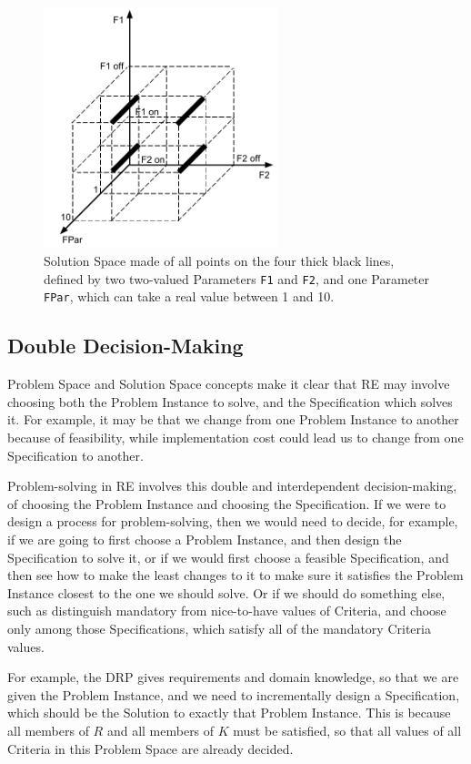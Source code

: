 \documentclass[graybox]{svmult}
\newcommand{\xt}[1]{\texttt{#1}}
\newcommand{\req}[1]{\xt{#1}}
\newcommand{\RE}{RE}
\newcommand{\ZJRP}{DRP}
\newcommand{\SolutionSpace}{Solution Space}
\newcommand{\ProblemSpace}{Problem Space}
\newcommand{\Specification}{Specification}
\newcommand{\Solution}{Solution}
\newcommand{\Criteria}{Criteria}
\newcommand{\ProblemInstance}{Problem Instance}
\newcommand{\Parameter}{Parameter}
\begin{document}
\begin{figure}[t]
	\centering
	\includegraphics[height=70mm]{Figures/f-ex-solution-space-many-points}
\caption{\SolutionSpace{} made of all points on the four thick black lines, defined by two two-valued \Parameter s \req{F1} and \req{F2}, and one \Parameter{} \req{FPar}, which can take a real value between 1 and 10.}
\label{f:ex:solution-space-many-points}
\end{figure}


%
\subsection{Double Decision-Making}\label{s:spaces:double-decision-making}
\ProblemSpace{} and \SolutionSpace{} concepts make it clear that \RE{} may involve choosing both the \ProblemInstance{} to solve, and the \Specification{} which solves it. For example, it may be that we change from one \ProblemInstance{} to another because of feasibility, while implementation cost could lead us to change from one \Specification{} to another. 

Problem-solving in \RE{} involves this double and interdependent decision-making, of choosing the \ProblemInstance{} and choosing the \Specification. If we were to design a process for problem-solving, then we would need to decide, for example, if we are going to first choose a \ProblemInstance, and then design the \Specification{} to solve it, or if we would first choose a feasible \Specification, and then see how to make the least changes to it to make sure it satisfies the \ProblemInstance{} closest to the one we should solve. Or if we should do something else, such as distinguish mandatory from nice-to-have values of \Criteria, and choose only among those \Specification s, which satisfy all of the mandatory \Criteria{} values.

For example, the \ZJRP{} gives requirements and domain knowledge, so that we are given the \ProblemInstance, and we need to incrementally design a \Specification, which should be the \Solution{} to exactly that \ProblemInstance. This is because all members of $R$ and all members of $K$ must be satisfied, so that all values of all \Criteria{} in this \ProblemSpace{} are already decided.
\end{document}
